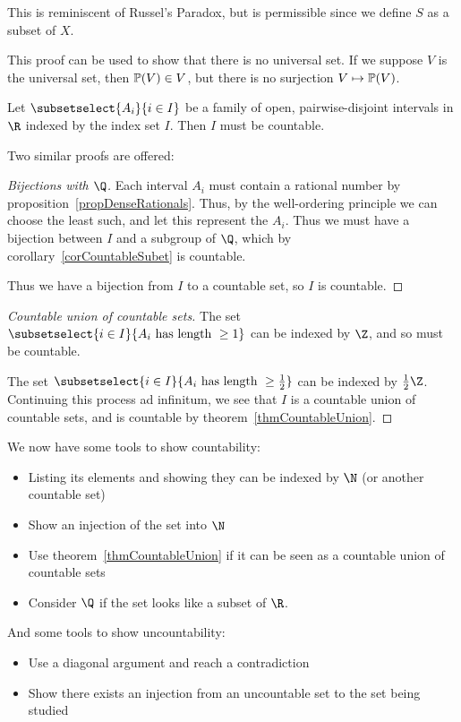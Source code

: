 \documentclass[../Main.tex]{subfiles}
\begin{document}
\begin{remarks}
    \item This is reminiscent of Russel's Paradox, but is permissible since we define $S$ as a subset of $X$.
    \item This proof can be used to show that there is no universal set. If we suppose $V$ is the universal set, then $\mathbb{P}(V) \in V$, but there is no surjection $V \mapsto \mathbb{P}(V)$.
\end{remarks}
\begin{lemma}
    Let $\subsetselect{A_i}{i \in I}$ be a family of open, pairwise-disjoint intervals in $\R$ indexed by the index set $I$. Then $I$ must be countable.
\end{lemma}
Two similar proofs are offered:
\begin{proof}[Bijections with $\Q$]
    Each interval $A_i$ must contain a rational number by proposition~\ref{propDenseRationals}. Thus, by the well-ordering principle we can choose the least such, and let this represent the $A_i$. Thus we must have a bijection between $I$ and a subgroup of $\Q$, which by corollary~\ref{corCountableSubet} is countable.\par
    Thus we have a bijection from $I$ to a countable set, so $I$ is countable.
\end{proof}
\begin{proof}[Countable union of countable sets]
    The set $\subsetselect{i \in I}{A_i \text{ has length } \geq 1}$ can be indexed by $\Z$, and so must be countable.\par
    The set $\subsetselect{i \in I}{A_i \text{ has length } \geq \frac{1}{2}}$ can be indexed by $\frac{1}{2}\Z$. Continuing this process ad infinitum, we see that $I$ is a countable union of countable sets, and is countable by theorem~\ref{thmCountableUnion}.
\end{proof}
We now have some tools to show countability:
\begin{itemize}
    \item Listing its elements and showing they can be indexed by $\N$ (or another countable set)
    \item Show an injection of the set into $\N$
    \item Use theorem~\ref{thmCountableUnion} if it can be seen as a countable union of countable sets
    \item Consider $\Q$ if the set looks like a subset of $\R$.
\end{itemize}
And some tools to show uncountability:
\begin{itemize}
    \item Use a diagonal argument and reach a contradiction
    \item Show there exists an injection from an uncountable set to the set being studied
\end{itemize}
\end{document}
